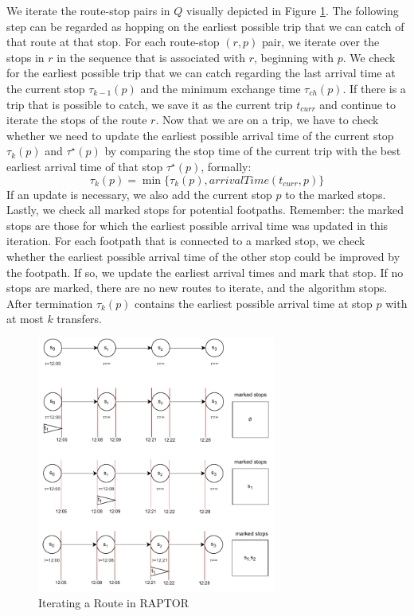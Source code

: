 We iterate the route-stop pairs in \(Q\) visually depicted in Figure \ref{fig:raptor}.
The following step can be regarded as hopping on the earliest possible trip that we can catch of that route at that stop.
For each route-stop \((r,p)\) pair, we iterate over the stops in \(r\) in the sequence that is associated with \(r\), beginning with \(p\).
We check for the earliest possible trip that we can catch regarding the last arrival time at the current stop \(\tau_{k-1}(p)\) and the minimum exchange time \(\tau_{ch}(p)\).
If there is a trip that is possible to catch, we save it as the current trip \(t_{curr}\) and continue to iterate the stops of the route \(r\).
Now that we are on a trip, we have to check whether we need to update the earliest possible arrival time of the current stop \(\tau_k(p)\) and \(\tau^\star(p)\) by comparing the stop time of the current trip with the best earliest arrival time of that stop \(\tau^\star(p)\), formally:
\[\tau_k(p) = \min\{\tau_k(p), arrivalTime(t_{curr}, p)\}\]
If an update is necessary, we also add the current stop \(p\) to the marked stops.
Lastly, we check all marked stops for potential footpaths.
Remember: the marked stops are those for which the earliest possible arrival time was updated in this iteration.
For each footpath that is connected to a marked stop, we check whether the earliest possible arrival time of the other stop could be improved by the footpath.
If so, we update the earliest arrival times and mark that stop.
If no stops are marked, there are no new routes to iterate, and the algorithm stops.
After termination \(\tau_k(p)\) contains the earliest possible arrival time at stop \(p\) with at most \(k\) transfers.
\begin{figure}
    \centering
    \includegraphics[width=0.70\textwidth]{Figures/related_work/raptor.pdf}
    \caption{Iterating a Route in RAPTOR}
    \label{fig:raptor}
\end{figure}

